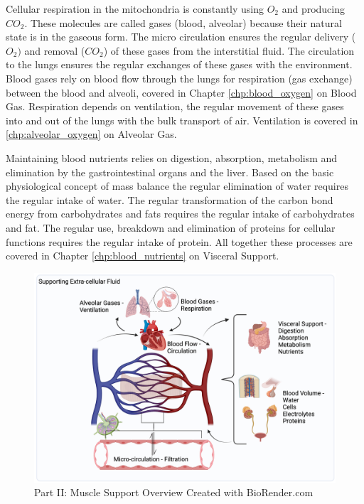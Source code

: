 Cellular respiration in the mitochondria is constantly using $O_2$ and producing $CO_2$. These molecules are called gases (blood, alveolar) because their natural state is in the gaseous form. The micro circulation ensures the regular delivery ($O_2)$ and removal ($CO_2$) of these gases from the interstitial fluid. The circulation to the lungs ensures the regular exchanges of these gases with the environment. Blood gases rely on blood flow through the lungs for respiration (gas exchange) between the blood and alveoli, covered in Chapter \ref{chp:blood_oxygen} on Blood Gas. Respiration depends on ventilation, the regular movement of these gases into and out of the lungs with the bulk transport of air. Ventilation is covered in \ref{chp:alveolar_oxygen} on Alveolar Gas. 

Maintaining blood nutrients relies on digestion, absorption, metabolism and elimination by the gastrointestinal organs and the liver. Based on the basic physiological concept of mass balance the regular elimination of water requires the regular intake of water. The regular transformation of the carbon bond energy from carbohydrates and fats requires the regular intake of carbohydrates and fat. The regular use, breakdown and elimination of proteins for cellular functions requires the regular intake of protein. All together these processes are covered in Chapter \ref{chp:blood_nutrients} on Visceral Support.

\begin{figure}[!h]
    \centering
    \includegraphics[width=1\linewidth]{./figure/part2_overview.png}
    \caption{Part II: Muscle Support Overview \footnotesize{Created with BioRender.com}}
    \label{fig:part2_overview}
\end{figure}

